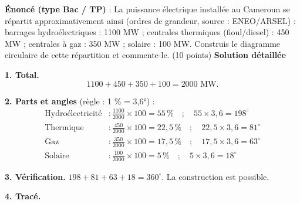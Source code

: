 \documentclass[11pt]{article}
\begin{document}
\begin{exoresolu}
\textbf{Énoncé (type Bac / TP)} : La puissance électrique installée au Cameroun se répartit approximativement ainsi (ordres de grandeur, source : ENEO/ARSEL) : barrages hydroélectriques : 1100 MW ; centrales thermiques (fioul/diesel) : 450 MW ; centrales à gaz : 350 MW ; solaire : 100 MW. Construis le diagramme circulaire de cette répartition et commente-le. (10 points)
\tcblower
\textbf{Solution détaillée}

\textbf{1. Total.}
\[ 1100 + 450 + 350 + 100 = 2000 \text{ MW.} \]

\textbf{2. Parts et angles} (règle : 1 \% = 3,6°) :
\begin{align*}
\text{Hydroélectricité} &: \frac{1100}{2000} \times 100 = 55\,\text{\%} \quad ; \quad 55 \times 3{,}6 = 198^{\circ} \\
\text{Thermique} &: \frac{450}{2000} \times 100 = 22{,}5\,\text{\%} \quad ; \quad 22{,}5 \times 3{,}6 = 81^{\circ} \\
\text{Gaz} &: \frac{350}{2000} \times 100 = 17{,}5\,\text{\%} \quad ; \quad 17{,}5 \times 3{,}6 = 63^{\circ} \\
\text{Solaire} &: \frac{100}{2000} \times 100 = 5\,\text{\%} \quad ; \quad 5 \times 3{,}6 = 18^{\circ}
\end{align*}

\textbf{3. Vérification.} $198 + 81 + 63 + 18 = 360^{\circ}$. La construction est possible.

\textbf{4. Tracé.}


\end{exoresolu}
\end{document}
